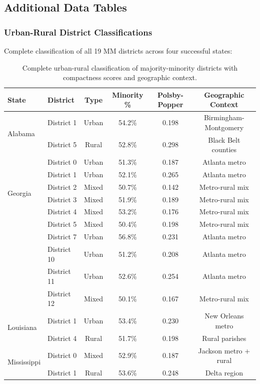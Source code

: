 \clearpage

\subsection{Additional Data Tables}

\subsubsection{Urban-Rural District Classifications}

Complete classification of all 19 MM districts across four successful states:

\begin{table}[h]
\centering
\small
\begin{tabular}{llcccc}
\toprule
\textbf{State} & \textbf{District} & \textbf{Type} & \textbf{Minority \%} & \textbf{Polsby-Popper} & \textbf{Geographic Context} \\
\midrule
\multirow{2}{*}{Alabama} & District 1 & Urban & 54.2\% & 0.198 & Birmingham-Montgomery \\
& District 5 & Rural & 52.8\% & 0.298 & Black Belt counties \\
\midrule
\multirow{6}{*}{Georgia} & District 0 & Urban & 51.3\% & 0.187 & Atlanta metro \\
& District 1 & Urban & 52.1\% & 0.265 & Atlanta metro \\
& District 2 & Mixed & 50.7\% & 0.142 & Metro-rural mix \\
& District 3 & Mixed & 51.9\% & 0.189 & Metro-rural mix \\
& District 4 & Mixed & 53.2\% & 0.176 & Metro-rural mix \\
& District 5 & Mixed & 50.4\% & 0.198 & Metro-rural mix \\
& District 7 & Urban & 56.8\% & 0.231 & Atlanta metro \\
& District 10 & Urban & 51.2\% & 0.208 & Atlanta metro \\
& District 11 & Urban & 52.6\% & 0.254 & Atlanta metro \\
& District 12 & Mixed & 50.1\% & 0.167 & Metro-rural mix \\
\midrule
\multirow{2}{*}{Louisiana} & District 1 & Urban & 53.4\% & 0.230 & New Orleans metro \\
& District 4 & Rural & 51.7\% & 0.198 & Rural parishes \\
\midrule
\multirow{2}{*}{Mississippi} & District 0 & Mixed & 52.9\% & 0.187 & Jackson metro + rural \\
& District 1 & Rural & 53.6\% & 0.248 & Delta region \\
\bottomrule
\end{tabular}
\caption{Complete urban-rural classification of majority-minority districts with compactness scores and geographic context.}
\end{table}

